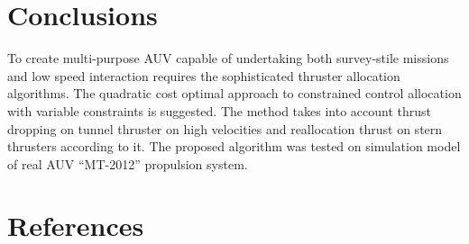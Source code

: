 \documentclass[a0,portrait]{a0poster}
\begin{document}
\begin{minipage}[t]{0.48\linewidth}
\section*{Conclusions}
\begin{multicols}{2}
To create multi-purpose AUV capable of undertaking both survey-stile missions and low speed interaction requires the sophisticated thruster allocation algorithms. The quadratic cost optimal approach to constrained control allocation with variable constraints is suggested. The method takes into account thrust dropping on tunnel thruster on high velocities and reallocation thrust on stern thrusters according to it. The proposed algorithm was tested on simulation model of real AUV ``MT-2012'' propulsion system.
\end{multicols}

\scriptsize
\section*{References}
\begin{multicols}{2}
\renewcommand\refname{\vskip -1cm}
\end{multicols}
\end{minipage}
\end{document}
